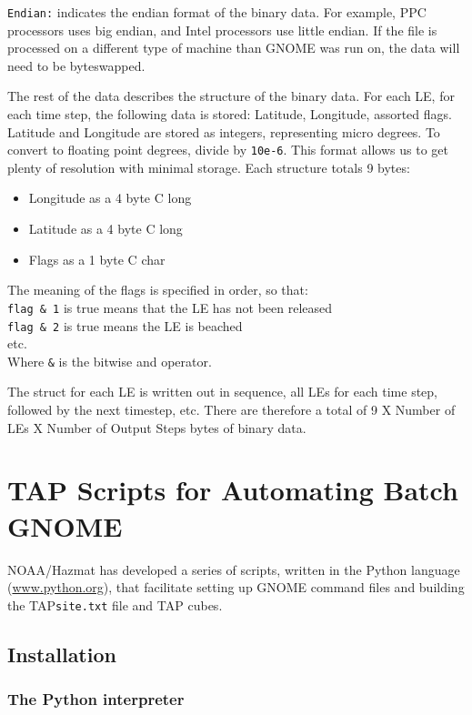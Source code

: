 \documentclass[12pt]{article}      %
\newcommand{\tap}{\textsf{TAP}\xspace}
\newcommand{\gnome}{\textsf{GNOME}\xspace}
\newcommand{\filename}[1]{\texttt{#1}}
\newcommand{\command}[1]{\texttt{#1}}
\begin{document}
\command{Endian:} indicates the endian format of the binary data. For
example, PPC processors uses big endian, and Intel processors use little
endian. If the file is processed on a different type of machine than
\gnome was run on, the data will need to be byteswapped.

The rest of the data describes the structure of the binary data. For
each LE, for each time step, the following data is stored: Latitude,
Longitude, assorted flags. Latitude and Longitude are stored as
integers, representing micro degrees. To convert to floating point
degrees, divide by \command{10e-6}. This format allows us to get plenty
of resolution with minimal storage. Each structure totals 9 bytes:
\begin{itemize}
\item Longitude as a 4 byte C long
\item Latitude as a 4 byte C long
\item Flags as a 1 byte C char
\end{itemize}
The meaning of the flags is specified in order, so that:\\
\verb#flag & 1# is true means that the LE has not been released\\
\verb#flag & 2# is true means the LE is beached\\
etc.\\
Where \verb#&# is the bitwise and operator.

The struct for each LE is written out in sequence, all LEs for each time
step, followed by the next timestep, etc. There are therefore a total of
9 X Number of LEs X Number of Output Steps bytes of binary data.

\section{\tap Scripts for Automating Batch \gnome} \label{sec:TAPScripts}

NOAA/Hazmat has developed a series of scripts, written in the Python
language (\url{www.python.org}), that facilitate setting up \gnome command
files and building the \tap \filename{site.txt} file and \tap cubes.

\subsection{Installation}

\subsubsection{The Python interpreter}
\end{document}
